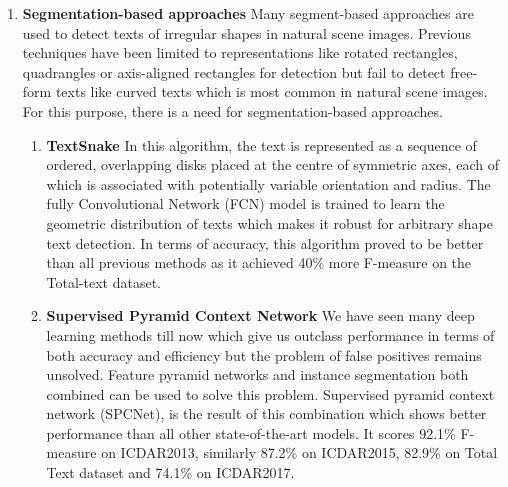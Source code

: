 \begin{enumerate}
\begin{enumerate}
        \item Rotational region convolutional neural network (R2CNN) \newline
        R2CNN \cite{R2CNNRR} is also an enhancement in the region proposal network like faster R-CNN. First of all, the Region proposal network(RPN) encloses multi-oriented text by generating bounding boxes which are aligned to the axis. Secondly, pooled features of different pooled sizes are extracted and these concatenated features are used to classify text/non-text regions and also predict inclined minimum area box and axis-aligned box. At the end, detection results are obtained by applying  inclined non-maximum suppression. This approach got competitive results on text detection benchmark datasets: ICDAR 2013 and ICDAR 2015.
    \end{enumerate}
    
    \item \textbf{Segmentation-based approaches} \newline
    Many segment-based approaches are used to detect texts of irregular shapes in natural scene images. Previous techniques have been limited to representations like rotated rectangles, quadrangles or axis-aligned rectangles for detection but fail to detect free-form texts like curved texts which is most common in natural scene images. For this purpose, there is a need for segmentation-based approaches.
    \begin{enumerate}
        \item \textbf{TextSnake}
         In this algorithm, the text is represented as a sequence of ordered, overlapping disks placed at the centre of symmetric axes, each of which is associated with potentially variable orientation and radius. The fully Convolutional Network (FCN) model is trained to learn the geometric distribution of texts which makes it robust for arbitrary shape text detection. In terms of accuracy, this algorithm proved to be better than all previous methods as it achieved 40\% more F-measure on the Total-text dataset.
         
         \item \textbf{Supervised Pyramid Context Network} \newline
         We have seen many deep learning methods till now which give us outclass performance in terms of both accuracy and efficiency but the problem of false positives remains unsolved. Feature pyramid networks and instance segmentation both combined can be used to solve this problem. Supervised pyramid context network (SPCNet), is the result of this combination which shows better performance than all other state-of-the-art models. It scores 92.1\% F-measure on ICDAR2013, similarly 87.2\% on ICDAR2015, 82.9\% on Total Text dataset and 74.1\% on ICDAR2017.\cite{xie2018scene}
    \end{enumerate}
    

\end{enumerate}
